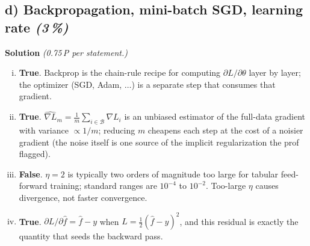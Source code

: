 \documentclass[11pt,a4paper]{article}
\newcommand{\subpoints}[1]{\textit{(#1\,\%)}}
\newcommand{\sol}{\noindent\textbf{Solution}}
\begin{document}
\subsection*{d) Backpropagation, mini-batch SGD, learning rate \subpoints{3}}
\sol{} \emph{(0.75\,P per statement.)}
\begin{enumerate}[(i)]
  \item \textbf{True}. Backprop is the chain-rule recipe for computing $\partial L / \partial \theta$
        layer by layer; the optimizer (SGD, Adam, $\ldots$) is a separate step that consumes that
        gradient.
  \item \textbf{True}. $\widehat{\nabla L}_m = \tfrac{1}{m}\sum_{i\in\mathcal B}\nabla L_i$ is an
        unbiased estimator of the full-data gradient with variance $\propto 1/m$; reducing $m$
        cheapens each step at the cost of a noisier gradient (the noise itself is one source of
        the implicit regularization the prof flagged).
  \item \textbf{False}. $\eta = 2$ is typically two orders of magnitude too large for tabular
        feed-forward training; standard ranges are $10^{-4}$ to $10^{-2}$. Too-large $\eta$ causes
        divergence, not faster convergence.
  \item \textbf{True}. $\partial L / \partial \hat f = \hat f - y$ when $L = \tfrac{1}{2}(\hat f - y)^2$,
        and this residual is exactly the quantity that seeds the backward pass.
\end{enumerate}
\end{document}
